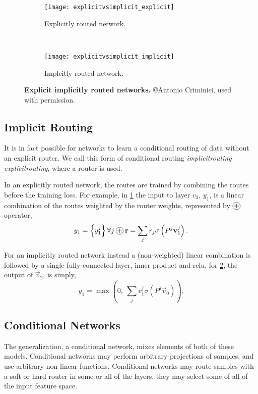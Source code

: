 \documentclass[thesis]{subfiles}
\begin{document}
	
	\begin{figure}[tbp] 
		\centering
		\begin{subfigure}[b]{0.33\textwidth}
			\centering
			\texttt{[image: explicitvsimplicit\_explicit]}
			\caption{Explicitly routed network.}\label{fig:explicitRouter}
		\end{subfigure}
		~
		\begin{subfigure}[b]{0.33\textwidth}
			\centering
			\texttt{[image: explicitvsimplicit\_implicit]}
			\caption{Implcitly routed network.}\label{fig:implicitRouter}
		\end{subfigure}
		\caption[Explicit \vs implicitly routed networks]{\textbf{Explicit \vs implicitly routed networks.} \copyright Antonio Criminisi, used with permission.}\label{fig:routerConnections}
	\end{figure}
	
	\subsection{Implicit Routing}
	It is in fact possible for networks to learn a conditional routing of data without an explicit router. We call this form of conditional routing \emph{\gls{implicitrouting}} \vs \emph{\gls{explicitrouting}}, where a router is used. 
	
	In an explicitly routed network, the routes are trained by combining the routes before the training loss. For example, in \cref{fig:explicitRouter} the input to layer $v_2$, $y_1$, is a linear combination of the routes weighted by the router weights, represented by $\circleplus$ operator,
	\begin{equation}
	y_1 = \left\{y_1^j\right\} \forall j\circleplus \vec r = \sum_j r_j \sigma\left(P^j \vec v_1^j \right).
	\end{equation}
	
	For an implicitly routed network instead a (non-weighted) linear combination is followed by a single fully-connected layer, \ie inner product and \gls{relu}, \ie for \cref{fig:implicitRouter}, the output of $\vec v_2$, is simply,
	\begin{equation}
	y_1 = \max \left(0, ~\sum_j v_1^j \sigma(P^j \vec v_0) \right).
	\end{equation}
	
	\subsection{Conditional Networks}
	The generalization, a conditional network, mixes elements of both of these models. Conditional networks may perform arbitrary projections of samples, and use arbitrary non-linear functions. Conditional networks may route samples with a soft or hard router in some or all of the layers, they may select some of all of the input feature space. 
\end{document}
